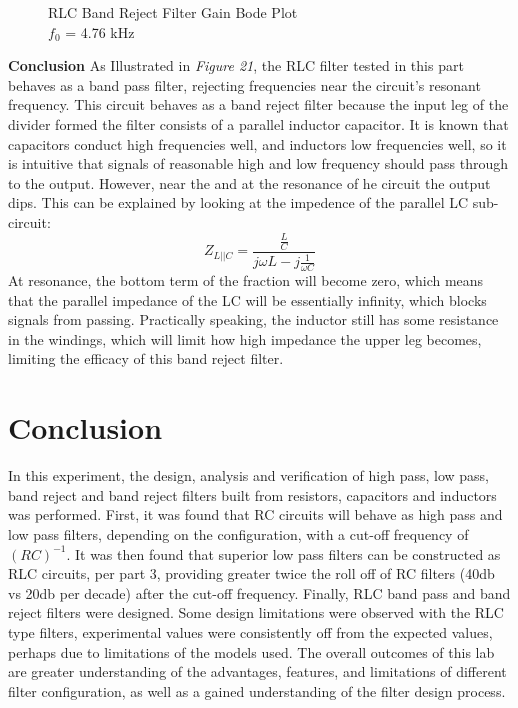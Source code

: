 \documentclass[12pt]{article}
\begin{document}
\FloatBarrier
\begin{figure}[h!]
\begin{center}
    	\resizebox{0.6\textwidth}{!}{}
\end{center}
\caption{RLC Band Reject Filter Gain Bode Plot \\ $f_0$ = 4.76 kHz}
\end{figure}
\FloatBarrier
\textbf{Conclusion}
As Illustrated in \textit{Figure 21}, the RLC filter tested in this part behaves as a band pass filter, rejecting frequencies near the circuit's resonant frequency. This circuit behaves as a band reject filter because the input leg of the divider formed the filter consists of a parallel inductor capacitor. It is known that capacitors conduct high frequencies well, and inductors low frequencies well, so it is intuitive that signals of reasonable high and low frequency should pass through to the output. However, near the and at the resonance of he circuit the output dips. This can be explained by looking at the impedence of the parallel LC sub-circuit:
\begin{equation}
Z_{L||C} = \frac{\frac{L}{C}}{j\omega L - j\frac{1}{\omega C}}
\end{equation}
At resonance, the bottom term of the fraction will become zero, which means that the parallel impedance of the LC will be essentially infinity, which blocks signals from passing. Practically speaking, the inductor still has some resistance in the windings, which will limit how high impedance the upper leg becomes, limiting the efficacy of this band reject filter.
\section{Conclusion}
In this experiment, the design, analysis and verification of high pass, low pass, band reject and band reject filters built from resistors, capacitors and inductors was performed. First, it was found that RC circuits will behave as high pass and low pass filters, depending on the configuration, with a cut-off frequency of $(RC)^{-1}$. It was then found that superior low pass filters can be constructed as RLC circuits, per part 3, providing greater twice the roll off of RC filters (40db vs 20db per decade) after the cut-off frequency. Finally, RLC band pass and band reject filters were designed. Some design limitations were observed with the RLC type filters, experimental values were consistently off from the expected values, perhaps due to limitations of the models used. The overall outcomes of this lab are greater understanding of the advantages, features, and limitations of different filter configuration, as well as a gained understanding of the filter design process.
\end{document}
